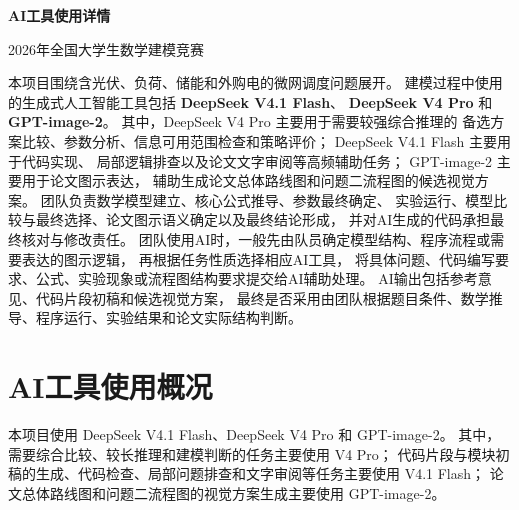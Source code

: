 \documentclass[UTF8,a4paper,11pt]{ctexart}
\begin{document}
\begin{center}
    \vspace*{-0.7cm}

    {\bfseries AI工具使用详情}

    \vspace{0.30cm}

    {\large 2026年全国大学生数学建模竞赛}

    \vspace{0.45cm}
\end{center}

\vspace{0.45cm}

本项目围绕含光伏、负荷、储能和外购电的微网调度问题展开。
建模过程中使用的生成式人工智能工具包括
\textbf{DeepSeek V4.1 Flash}、
\textbf{DeepSeek V4 Pro}
和
\textbf{GPT-image-2}。
其中，DeepSeek V4 Pro 主要用于需要较强综合推理的
备选方案比较、参数分析、信息可用范围检查和策略评价；
DeepSeek V4.1 Flash 主要用于代码实现、
局部逻辑排查以及论文文字审阅等高频辅助任务；
GPT-image-2 主要用于论文图示表达，
辅助生成论文总体路线图和问题二流程图的候选视觉方案。
团队负责数学模型建立、核心公式推导、参数最终确定、
实验运行、模型比较与最终选择、论文图示语义确定以及最终结论形成，
并对AI生成的代码承担最终核对与修改责任。
团队使用AI时，一般先由队员确定模型结构、程序流程或需要表达的图示逻辑，
再根据任务性质选择相应AI工具，
将具体问题、代码编写要求、公式、实验现象或流程图结构要求提交给AI辅助处理。
AI输出包括参考意见、代码片段初稿和候选视觉方案，
最终是否采用由团队根据题目条件、数学推导、程序运行、实验结果和论文实际结构判断。

\section{AI工具使用概况}

本项目使用 DeepSeek V4.1 Flash、DeepSeek V4 Pro 和 GPT-image-2。
其中，需要综合比较、较长推理和建模判断的任务主要使用 V4 Pro；
代码片段与模块初稿的生成、代码检查、局部问题排查和文字审阅等任务主要使用 V4.1 Flash；
论文总体路线图和问题二流程图的视觉方案生成主要使用 GPT-image-2。
\end{document}
